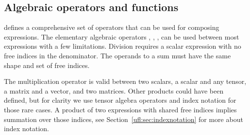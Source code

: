 \subsection{Algebraic operators and functions} \label{ufl:sec:algebra}

\ufl{} defines a comprehensive set of operators that can be used for
composing expressions.  The elementary algebraic operators \icode{+},
\icode{-}, \icode{*}, \icode{/} can be used between most \ufl{}
expressions with a few limitations.  Division requires a scalar
expression with no free indices in the denominator.  The operands to a
sum must have the same shape and set of free indices.

The multiplication operator \icode{*} is valid between two scalars, a
scalar and any tensor, a matrix and a vector, and two matrices.  Other
products could have been defined, but for clarity we use tensor
algebra operators and index notation for those rare cases.  A product
of two expressions with shared free indices implies summation over
those indices, see Section~\ref{ufl:sec:indexnotation} for more about
index notation.

